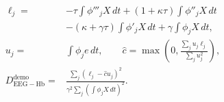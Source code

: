 \documentclass{article}
\begin{document}
\fontsize{22}{29}\selectfont
\[
\begin{aligned}\ell_j={}&-\tau\int\phi'''_jX\,dt+(1+\kappa\tau)\int\phi''_jX\,dt\\&-(\kappa+\gamma\tau)\int\phi'_jX\,dt+\gamma\int\phi_jX\,dt,\\u_j={}&\int\phi_j e\,dt,\qquad\widehat c=\max\left(0,\frac{\sum_ju_j\ell_j}{\sum_ju_j^2}\right),\\D_{\mathrm{EEG-Hb}}^{\mathrm{demo}}={}&\frac{\sum_j(\ell_j-\widehat c u_j)^2}{\gamma^2\sum_j(\int\phi_jX\,dt)^2}.\end{aligned}
\]
\end{document}
